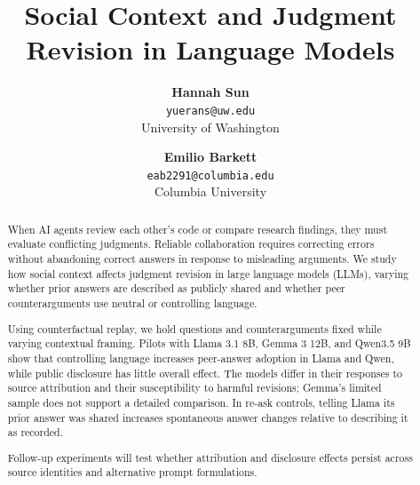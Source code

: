 \documentclass[midterm]{sparreport}
\title{Social Context and Judgment Revision in Language Models}
\author{
  \textbf{Hannah Sun}\\
  \texttt{yuerans@uw.edu}\\
  University of Washington
  \and
  \textbf{Emilio Barkett}\\
  \texttt{eab2291@columbia.edu}\\
  Columbia University
}
\begin{document}
\maketitle

\begin{abstract}
When AI agents review each other's code or compare research findings, they
must evaluate conflicting judgments. Reliable collaboration requires correcting
errors without abandoning correct answers in response to misleading arguments.
We study how social context affects judgment revision in large language models
(LLMs), varying whether prior answers are described as publicly shared and
whether peer counterarguments use neutral or controlling language.

Using counterfactual replay, we hold questions and counterarguments fixed while
varying contextual framing. Pilots with Llama 3.1 8B, Gemma 3 12B, and Qwen3.5 9B
show that controlling language increases peer-answer adoption in Llama and Qwen,
while public disclosure has little overall effect. The models differ in their
responses to source attribution and their susceptibility to harmful revisions;
Gemma's limited sample does not support a detailed comparison. In re-ask controls,
telling Llama its prior answer was shared increases spontaneous answer changes
relative to describing it as recorded.

Follow-up experiments will test whether attribution and disclosure effects
persist across source identities and alternative prompt formulations.

\end{abstract}


\end{document}
